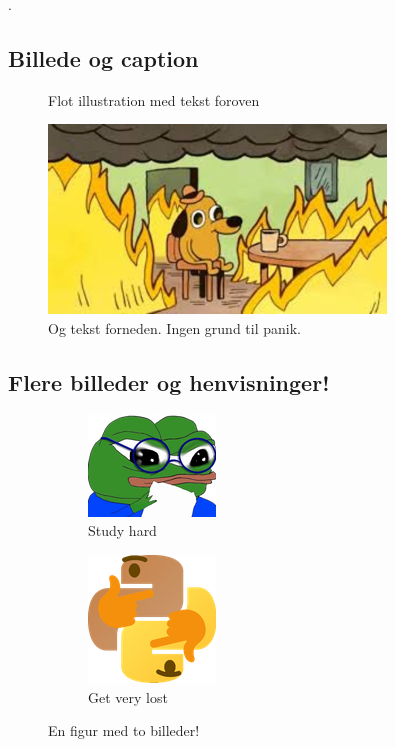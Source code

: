 \lipsum[5] \cite{einstein}. 

\subsection{Billede og caption}
\label{sec:1.1}
\lipsum[10]

\begin{figure}[H]
    \centering
    \caption*{Flot illustration med tekst foroven}
    \includegraphics[width = 0.8\textwidth ]{figures/this_is_fine.png}
    \caption{Og tekst forneden. Ingen grund til panik. \cite{menabrea}}
    \label{fig:fine}
\end{figure}

\subsection{Flere billeder og henvisninger!}
\label{sec:1.2}

\begin{figure}[H]
\centering
\begin{subfigure}{.5\textwidth}
  \centering
  \includegraphics[width=.4\linewidth]{figures/pepe_study.png}
  \caption{Study hard}
  \label{fig:study}
\end{subfigure}%
\begin{subfigure}{.5\textwidth}
  \centering
  \includegraphics[width=.4\linewidth]{figures/pythonk.png}
  \caption{Get very lost}
  \label{fig:thonk}
\end{subfigure}
\caption{En figur med to billeder!}
\label{fig:two_img}
\end{figure}

